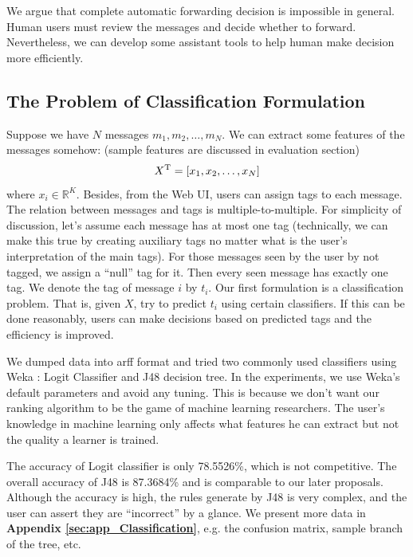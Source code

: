 \documentclass{sig-alternate}
\begin{document}
We argue that complete automatic forwarding decision is impossible in general. 
Human users must review the messages and decide whether to forward. 
Nevertheless, we can develop some assistant tools to 
help human make decision more efficiently. 


\subsection{The Problem of Classification Formulation}
\label{sec:The Problem of Classification}

Suppose we have $N$ messages $m_1, m_2, \ldots, m_N$. 
We can extract some features of the messages somehow:
(sample features are discussed in evaluation section)
\begin{equation}
	X^\mathrm{T} = [x_1, x_2, \ldots, x_N]
\end{equation}
where $x_i \in \mathbb{R}^K$. 
Besides, from the Web UI, users can assign tags to each message. 
The relation between messages and tags is multiple-to-multiple. 
For simplicity of discussion, 
let's assume each message has at most one tag
(technically, we can make this true by creating auxiliary tags no 
matter what is the user's interpretation of the main tags). 
For those messages seen by the user by not tagged, 
we assign a ``null'' tag for it. 
Then every seen message has exactly one tag. 
We denote the tag of message $i$ by $t_i$. 
Our first formulation is a classification problem. 
That is, given $X$, try to predict $t_i$ using certain classifiers. 
If this can be done reasonably, users can make decisions based 
on predicted tags and the efficiency is improved. 

We dumped data into arff format and tried two 
commonly used classifiers using Weka \cite{weka}: 
Logit Classifier and J48 decision tree. 
In the experiments, we use Weka's default parameters and avoid any tuning. 
This is because we don't want our ranking algorithm to be the game of machine learning researchers. 
The user's knowledge in machine learning only affects what features he can extract 
but not the quality a learner is trained. 

The accuracy of Logit classifier is only 78.5526\%, 
which is not competitive.
The overall accuracy of J48 is 87.3684\%
and is comparable to our later proposals. 
Although the accuracy is high, 
the rules generate by J48 is very complex, 
and the user can assert they are ``incorrect'' by a glance. 
We present more data in \textbf{Appendix \ref{sec:app_Classification}}, 
e.g. the confusion matrix, sample branch of the tree, etc. 
\end{document}
